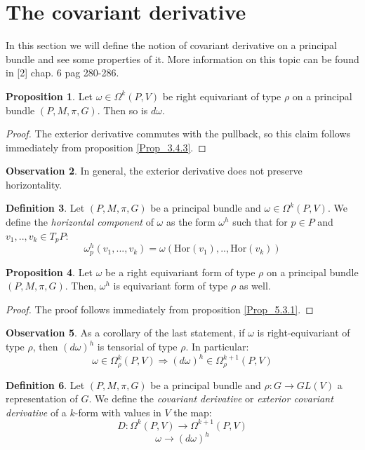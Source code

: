\documentclass[12pt,a4paper]{report}
\theoremstyle{definition}
\newtheorem{Def}{Definition}[chapter]
\theoremstyle{Theorem}
\newtheorem{Prop}[Def]{Proposition}
\theoremstyle{definition}
\theoremstyle{definition}
\newtheorem{Obs}[Def]{Observation}
\begin{document}
	\section{The covariant derivative}
	In this section we will define the notion of covariant derivative on a principal bundle and see some properties of it. More information on this topic can be found in [2] chap. 6 pag 280-286.
	\begin{Prop}
		Let $\omega\in\Omega^k(P,V)$ be right equivariant of type $\rho$ on a principal bundle $(P,M,\pi,G)$. Then so is $d\omega$.
	\end{Prop}
	\begin{proof}
		The exterior derivative commutes with the pullback, so this claim follows immediately from proposition \ref{Prop_3.4.3}.
	\end{proof}
	\begin{Obs}
		In general, the exterior derivative does not preserve horizontality.
	\end{Obs}
	\begin{Def}
		Let $(P,M,\pi,G)$ be a principal bundle and $\omega\in \Omega^k(P,V)$. We define the \textit{horizontal component} of $\omega$ as the form $\omega^h$ such that for $p\in P$ and $v_1,..,v_k\in T_pP$:
		$$\omega^h_p(v_1,...,v_k)=\omega(\mathrm{Hor}(v_1),..,\mathrm{Hor}(v_k))$$
	\end{Def}
	\begin{Prop}
		Let $\omega$ be a right equivariant form of type $\rho$ on a principal bundle $(P,M,\pi,G)$. Then, $\omega^h$ is equivariant form of type $\rho$ as well.
	\end{Prop}
	\begin{proof}
		The proof follows immediately from proposition \ref{Prop_5.3.1}.
	\end{proof}
	\begin{Obs}
		As a corollary of the last statement, if $\omega$ is right-equivariant of type $\rho$, then $(d\omega)^h$ is tensorial of type $\rho$. In particular:
		$$\omega\in \Omega^k_\rho(P,V)\Rightarrow (d\omega)^h\in\Omega^{k+1}_\rho(P,V)$$
	\end{Obs}
	\begin{Def}
		Let $(P,M,\pi,G)$ be a principal bundle and $\rho:G\rightarrow GL(V)$ a representation of $G$. We define the \textit{covariant derivative} or \textit{exterior covariant derivative} of a $k$-form with values in $V$ the map:
		$$D:\Omega^k(P,V)\rightarrow \Omega^{k+1}(P,V)$$
		$$\omega\rightarrow (d\omega)^h$$
	\end{Def}
\end{document}
